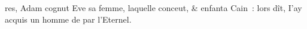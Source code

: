 \documentclass{scrbook}
\begin{document}
\parbox{6cm}{
res, Adam cognut Eve sa fem\-me, laquelle conceut, \& enfan\-ta
 Cain~: lors dît, I'ay acquis un homme de par l'Eternel.
}
\end{document}
